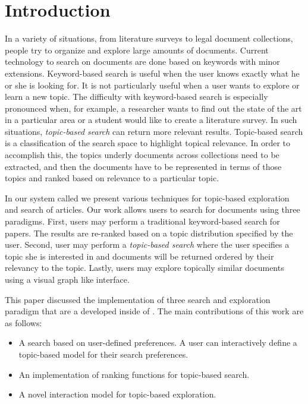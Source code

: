\section{Introduction}

In a variety of situations, from literature surveys to legal 
document collections, people try to organize and explore large 
amounts of documents. Current technology to search on documents are 
done based on keywords with minor extensions. Keyword-based search is useful when the 
user knows exactly what he or she is looking for. It is not 
particularly useful when a user wants to explore or learn a new 
topic. 
The difficulty with keyword-based search is especially pronounced when, for
example, a researcher wants to find out the state of the art in a particular
area or a student would like to create a literature survey. In such situations,
\textsl{topic-based search} can return more relevant results. 
Topic-based search is a classification of the search space to 
highlight topical relevance. In order to accomplish this, the topics 
underly documents across collections need to be extracted, and then 
the documents have to be represented in terms of those topics and ranked 
based on relevance to a particular topic. 

In our system called \system we present various techniques for topic-based exploration 
and search of articles. Our work allows users 
to search for documents using three paradigms. 
First, users may perform a traditional keyword-based search for papers.
The results are re-ranked based on a topic distribution specified by the user. 
Second, user may perform a \textsl{topic-based search} where the user specifies 
a topic she is interested in and documents will be returned ordered by their relevancy to the topic.
Lastly, users may explore topically similar documents using a visual 
graph like interface.


This paper discussed the implementation of three search and exploration paradigm that are a developed inside of \system.
The main contributions of this work are as follows:
\begin{itemize}
\item A search based on user-defined preferences.
A user can interactively define a topic-based model for their search preferences.
\item An implementation of ranking functions for topic-based search.
\item A novel interaction model for topic-based exploration.
\end{itemize}

